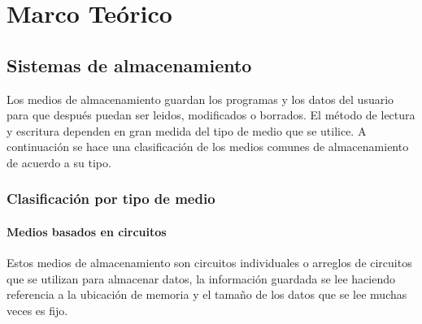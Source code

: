 {
  \linespread{1}
  \cleardoublepage  
  \chapter{Marco Te\'{o}rico}
  \label{chap:cap1}
}

  \section {Sistemas de almacenamiento}

Los medios de almacenamiento guardan los programas y los datos del usuario para que despu\'{e}s puedan ser leidos, modificados o borrados. El m\'{e}todo de lectura y escritura dependen en gran medida del tipo de medio que se utilice. A continuaci\'{o}n se hace una clasificaci\'{o}n de los medios comunes de almacenamiento de acuerdo a su tipo.

    \subsection {Clasificaci\'{o}n por tipo de medio}

      \subsubsection*{Medios basados en circuitos}

Estos medios de almacenamiento son circuitos individuales o arreglos de circuitos que se utilizan para almacenar datos, la informaci\'{o}n guardada se lee haciendo referencia a la ubicaci\'{o}n de memoria y el tama\~{n}o de los datos que se lee muchas veces es fijo.

